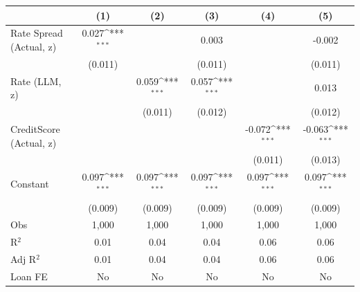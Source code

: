 {
\def\sym#1{\ifmmode^{#1}\else\(^{#1}\)\fi}
\begin{tabular}{l*{5}{c}}
\toprule
                              &\multicolumn{1}{c}{(1)}         &\multicolumn{1}{c}{(2)}         &\multicolumn{1}{c}{(3)}         &\multicolumn{1}{c}{(4)}         &\multicolumn{1}{c}{(5)}         \\
\midrule
Rate Spread (Actual, z)       &    0.027\sym{***}&                  &    0.003         &                  &   -0.002         \\
                              &  (0.011)         &                  &  (0.011)         &                  &  (0.011)         \\
Rate (LLM, z)                 &                  &    0.059\sym{***}&    0.057\sym{***}&                  &    0.013         \\
                              &                  &  (0.011)         &  (0.012)         &                  &  (0.012)         \\
CreditScore (Actual, z)       &                  &                  &                  &   -0.072\sym{***}&   -0.063\sym{***}\\
                              &                  &                  &                  &  (0.011)         &  (0.013)         \\
Constant                      &    0.097\sym{***}&    0.097\sym{***}&    0.097\sym{***}&    0.097\sym{***}&    0.097\sym{***}\\
                              &  (0.009)         &  (0.009)         &  (0.009)         &  (0.009)         &  (0.009)         \\
\midrule
Obs                           &    1,000         &    1,000         &    1,000         &    1,000         &    1,000         \\
R$^2$                         &     0.01         &     0.04         &     0.04         &     0.06         &     0.06         \\
Adj R$^2$                     &     0.01         &     0.04         &     0.04         &     0.06         &     0.06         \\
Loan FE                       &       No         &       No         &       No         &       No         &       No         \\
\bottomrule
\end{tabular}
}
